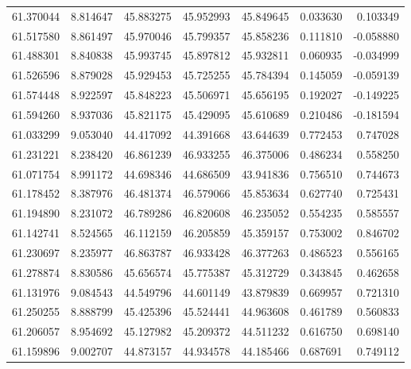 \begin{tabular}{rrrrrrr}
 61.370044 &   8.814647 &         45.883275 &         45.952993 &         45.849645 &  0.033630 &  0.103349 \\
 61.517580 &   8.861497 &         45.970046 &         45.799357 &         45.858236 &  0.111810 & -0.058880 \\
 61.488301 &   8.840838 &         45.993745 &         45.897812 &         45.932811 &  0.060935 & -0.034999 \\
 61.526596 &   8.879028 &         45.929453 &         45.725255 &         45.784394 &  0.145059 & -0.059139 \\
 61.574448 &   8.922597 &         45.848223 &         45.506971 &         45.656195 &  0.192027 & -0.149225 \\
 61.594260 &   8.937036 &         45.821175 &         45.429095 &         45.610689 &  0.210486 & -0.181594 \\
 61.033299 &   9.053040 &         44.417092 &         44.391668 &         43.644639 &  0.772453 &  0.747028 \\
 61.231221 &   8.238420 &         46.861239 &         46.933255 &         46.375006 &  0.486234 &  0.558250 \\
 61.071754 &   8.991172 &         44.698346 &         44.686509 &         43.941836 &  0.756510 &  0.744673 \\
 61.178452 &   8.387976 &         46.481374 &         46.579066 &         45.853634 &  0.627740 &  0.725431 \\
 61.194890 &   8.231072 &         46.789286 &         46.820608 &         46.235052 &  0.554235 &  0.585557 \\
 61.142741 &   8.524565 &         46.112159 &         46.205859 &         45.359157 &  0.753002 &  0.846702 \\
 61.230697 &   8.235977 &         46.863787 &         46.933428 &         46.377263 &  0.486523 &  0.556165 \\
 61.278874 &   8.830586 &         45.656574 &         45.775387 &         45.312729 &  0.343845 &  0.462658 \\
 61.131976 &   9.084543 &         44.549796 &         44.601149 &         43.879839 &  0.669957 &  0.721310 \\
 61.250255 &   8.888799 &         45.425396 &         45.524441 &         44.963608 &  0.461789 &  0.560833 \\
 61.206057 &   8.954692 &         45.127982 &         45.209372 &         44.511232 &  0.616750 &  0.698140 \\
 61.159896 &   9.002707 &         44.873157 &         44.934578 &         44.185466 &  0.687691 &  0.749112 \\

\end{tabular}
